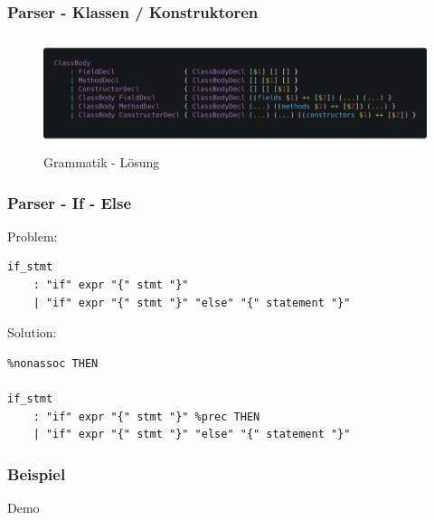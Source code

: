 \begin{frame}[fragile]
	\frametitle{Parser - Klassen / Konstruktoren}
	\begin{figure}[H]
		\centering
		\includegraphics[width=0.9\linewidth]{images/parser/full-class-ast.png}
		\caption{Grammatik - Lösung}
		\label{fig:images/parser/full-class-ast}
	\end{figure}
\end{frame}

\begin{frame}[fragile]
	\frametitle{Parser - If - Else}
	Problem:
	\begin{lstlisting}
if_stmt
    : "if" expr "{" stmt "}"
    | "if" expr "{" stmt "}" "else" "{" statement "}"
	\end{lstlisting}
	\pause
	Solution:

	\begin{lstlisting}
%nonassoc THEN

if_stmt
    : "if" expr "{" stmt "}" %prec THEN
    | "if" expr "{" stmt "}" "else" "{" statement "}"
	\end{lstlisting}
\end{frame}

\begin{frame}[fragile]
	\frametitle{Beispiel}
	\begin{center}
		\Huge Demo
	\end{center}
\end{frame}


